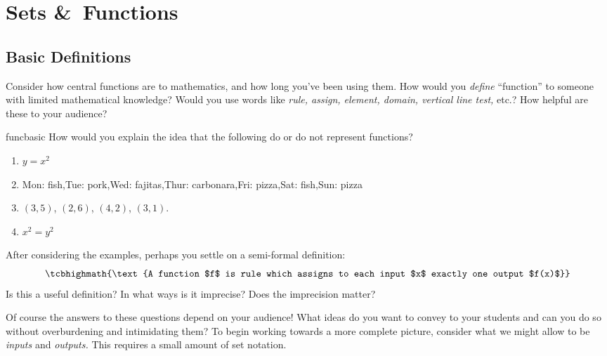 \section{Sets \&\ Functions}\label{chap:func}

\subsection{Basic Definitions}\label{sec:funcdef}

Consider how central functions are to mathematics, and how long you've been using them. How would you \emph{define} ``function'' to someone with limited mathematical knowledge? Would you use words like \emph{rule, assign, element, domain, vertical line test,} etc.? How helpful are these to your audience?

\begin{examples}{}{funcbasic}
	How would you explain the idea that the following do or do not represent functions?\vspace{-5pt}
	\begin{enumerate}\itemsep0pt
	  \item $y=x^2$
	  \item\label{ex:funcbasic2} Mon: fish,\quad Tue: pork,\quad Wed: fajitas,\quad Thur: carbonara,\quad Fri: pizza,\quad Sat: fish,\quad Sun: pizza
	  \item $(3,5)$, $(2,6)$, $(4,2)$, $(3,1)$.
	  \item $x^2=y^2$
	\end{enumerate}
\end{examples}

After considering the examples, perhaps you settle on a semi-formal definition:
\[
	\tcbhighmath{\text{A function $f$ is rule which assigns to each input $x$ exactly one output $f(x)$}}
\]
Is this a useful definition? In what ways is it imprecise? Does the imprecision matter?
\medbreak

Of course the answers to these questions depend on your audience! What ideas do you want to convey to your students and can you do so without overburdening and intimidating them? To begin working towards a more complete picture, consider what we might allow to be \emph{inputs} and \emph{outputs.} This requires a small amount of set notation.

